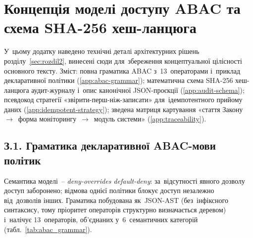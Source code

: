 \clearpage
\section{Концепція моделі доступу ABAC та схема SHA-256 хеш-ланцюга}
\label{app:abac-audit}

У~цьому додатку наведено технічні деталі архітектурних рішень розділу~\ref{sec:rozdil2}, винесені сюди для~збереження концептуальної цілісності основного тексту. Зміст: повна граматика ABAC з~13~операторами і~приклад декларативної політики (\ref{app:abac-grammar}); математична схема SHA-256 хеш-ланцюга аудит-журналу і~опис канонічної JSON-проєкції (\ref{app:audit-schema}); псевдокод стратегії «звірити-перш-ніж-записати» для~ідемпотентного прийому даних (\ref{app:idempotent-strategy}); зведена матриця картування «стаття Закону~$\to$~форма моніторингу~$\to$~модуль системи» (\ref{app:traceability}).

\subsection*{З.1. Граматика декларативної ABAC-мови політик}
\label{app:abac-grammar}

Семантика моделі~-- \emph{deny-overrides default-deny}: за~відсутності явного дозволу доступ заборонено; відмова однієї політики блокує доступ незалежно від~дозволів інших. Граматика побудована як~JSON-AST (без~інфіксного синтаксису, тому пріоритет операторів структурно визначається деревом) і~налічує 13~операторів, об'єднаних у~6~семантичних категорій (табл.~\ref{tab:abac_grammar}).

